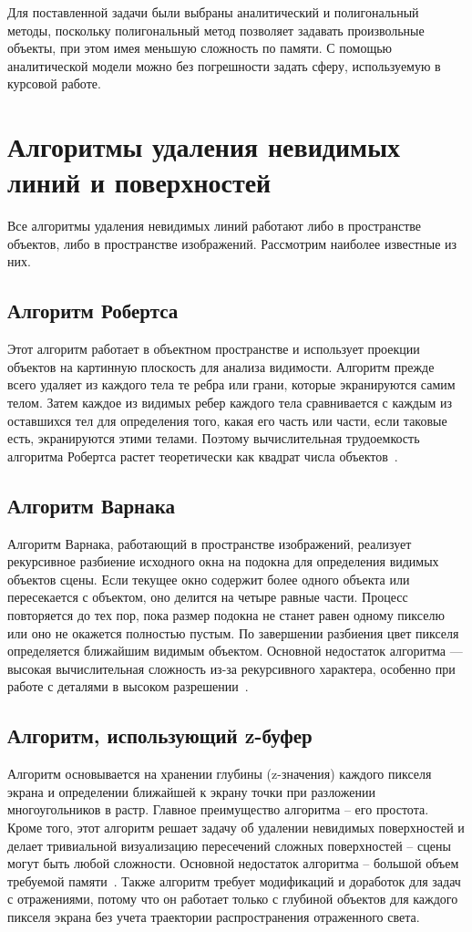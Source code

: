 Для поставленной задачи были выбраны аналитический и полигональный методы, поскольку полигональный метод позволяет задавать произвольные объекты, при этом имея меньшую сложность по памяти. С помощью аналитической модели можно без погрешности задать сферу, используемую в курсовой работе.


\section{Алгоритмы удаления невидимых линий и поверхностей}
Все алгоритмы удаления невидимых линий работают либо в пространстве объектов, либо в пространстве изображений. Рассмотрим наиболее известные из них.
\subsection{Алгоритм Робертса}
Этот алгоритм работает в объектном пространстве и использует проекции объектов на картинную плоскость для анализа видимости. Алгоритм прежде всего удаляет из каждого тела те ребра или грани, которые экранируются самим телом. Затем каждое из видимых ребер каждого тела сравнивается с каждым из оставшихся тел для определения того, какая его часть или части, если таковые есть, экранируются этими телами. Поэтому вычислительная трудоемкость алгоритма Робертса растет теоретически как квадрат числа объектов~\cite{lit1,lit2}.

\subsection{Алгоритм Варнака}
Алгоритм Варнака, работающий в пространстве изображений, реализует рекурсивное разбиение исходного окна на подокна для определения видимых объектов сцены. Если текущее окно содержит более одного объекта или пересекается с объектом, оно делится на четыре равные части. Процесс повторяется до тех пор, пока размер подокна не станет равен одному пикселю или оно не окажется полностью пустым. По завершении разбиения цвет пикселя определяется ближайшим видимым объектом. Основной недостаток алгоритма — высокая вычислительная сложность из-за рекурсивного характера, особенно при работе с деталями в высоком разрешении~\cite{lit3}.

\subsection{Алгоритм, использующий z-буфер}

Алгоритм основывается на хранении глубины (z-значения) каждого пикселя экрана и определении ближайшей к экрану точки при разложении многоугольников в растр.
Главное преимущество алгоритма -- его простота. Кроме того, этот алгоритм решает задачу об удалении невидимых поверхностей и делает тривиальной визуализацию пересечений сложных поверхностей -- сцены могут быть любой сложности.
Основной недостаток алгоритма -- большой объем требуемой памяти~\cite{lit1}. Также алгоритм требует модификаций и доработок для задач с отражениями, потому что он работает только с глубиной объектов для каждого пикселя экрана без учета траектории распространения отраженного света.


